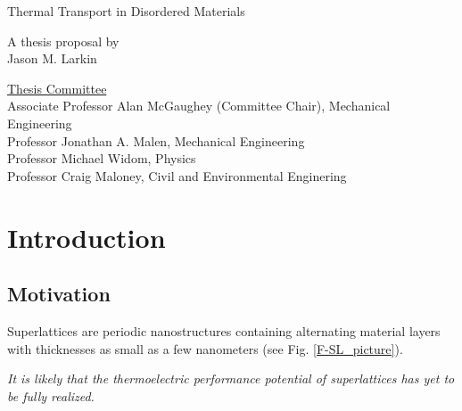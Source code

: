\documentclass[letterpaper,12pt]{article}
\begin{document}
\begin{center}



\centering

\vspace{1.1in}

\LARGE Thermal Transport in Disordered Materials\Large

\vspace{1in} A thesis proposal by\\Jason M. Larkin\\
\vspace{1.1in}


\parbox[h]{4in}{}

\thispagestyle{empty}
\end{center}
\vspace{2.in}
\parbox[b]{6.5in}{\noindent \underline{Thesis Committee}\\
\noindent Associate Professor Alan McGaughey (Committee Chair), Mechanical Engineering\\
Professor Jonathan A. Malen, Mechanical Engineering \\
Professor Michael Widom, Physics \\
Professor Craig Maloney, Civil and Environmental Enginering\\}

\clearpage

\tableofcontents

\clearpage

\section{\label{S-Intro}Introduction}

\subsection{\label{S-Intro-Motivation}Motivation}

Superlattices are periodic nanostructures containing alternating
material layers with thicknesses as small as a few nanometers (see
Fig.
\ref{F-SL_picture}).\cite{capinski1999,chakraborty2003,caylor2005,ezzahri2005,borca-tasciuc2000,borca-tasciuc2002,huxtablethesis,venkata2000}

 \textit{It is
likely that the thermoelectric performance potential of
superlattices has yet to be fully realized.}
\end{document}
